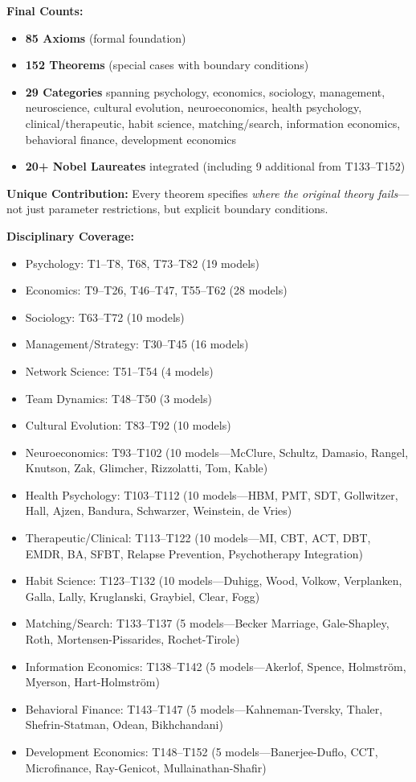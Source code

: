 \begin{tcolorbox}[colback=green!5!white, colframe=green!75!black,
    title=Complete Framework: 152 Theorems Across 29 Categories]
\textbf{Final Counts:}
\begin{itemize}[nosep]
\item \textbf{85 Axioms} (formal foundation)
\item \textbf{152 Theorems} (special cases with boundary conditions)
\item \textbf{29 Categories} spanning psychology, economics, sociology, management, neuroscience, cultural evolution, neuroeconomics, health psychology, clinical/therapeutic, habit science, matching/search, information economics, behavioral finance, development economics
\item \textbf{20+ Nobel Laureates} integrated (including 9 additional from T133--T152)
\end{itemize}

\textbf{Unique Contribution:} Every theorem specifies \textit{where the original theory fails}---not just parameter restrictions, but explicit boundary conditions.

\textbf{Disciplinary Coverage:}
\begin{itemize}[nosep]
\item Psychology: T1--T8, T68, T73--T82 (19 models)
\item Economics: T9--T26, T46--T47, T55--T62 (28 models)
\item Sociology: T63--T72 (10 models)
\item Management/Strategy: T30--T45 (16 models)
\item Network Science: T51--T54 (4 models)
\item Team Dynamics: T48--T50 (3 models)
\item Cultural Evolution: T83--T92 (10 models)
\item Neuroeconomics: T93--T102 (10 models---McClure, Schultz, Damasio, Rangel, Knutson, Zak, Glimcher, Rizzolatti, Tom, Kable)
\item Health Psychology: T103--T112 (10 models---HBM, PMT, SDT, Gollwitzer, Hall, Ajzen, Bandura, Schwarzer, Weinstein, de Vries)
\item Therapeutic/Clinical: T113--T122 (10 models---MI, CBT, ACT, DBT, EMDR, BA, SFBT, Relapse Prevention, Psychotherapy Integration)
\item Habit Science: T123--T132 (10 models---Duhigg, Wood, Volkow, Verplanken, Galla, Lally, Kruglanski, Graybiel, Clear, Fogg)
\item Matching/Search: T133--T137 (5 models---Becker Marriage, Gale-Shapley, Roth, Mortensen-Pissarides, Rochet-Tirole)
\item Information Economics: T138--T142 (5 models---Akerlof, Spence, Holmström, Myerson, Hart-Holmström)
\item Behavioral Finance: T143--T147 (5 models---Kahneman-Tversky, Thaler, Shefrin-Statman, Odean, Bikhchandani)
\item Development Economics: T148--T152 (5 models---Banerjee-Duflo, CCT, Microfinance, Ray-Genicot, Mullainathan-Shafir)
\end{itemize}


\end{tcolorbox}

